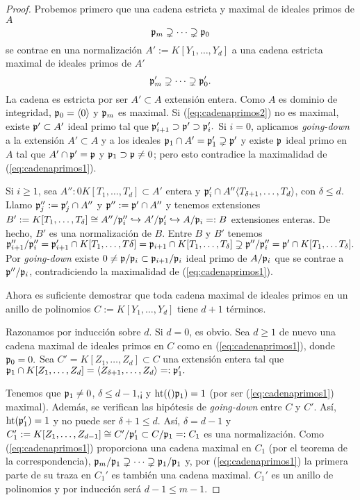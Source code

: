 \documentclass[../main.tex]{subfiles}
\begin{document}
\begin{proof}
	Probemos primero que una cadena estricta y maximal de ideales primos de $A$
	\begin{equation}\label{eq:cadenaprimos1}
	\mathfrak{p}_m\supsetneq\cdots\supsetneq\mathfrak{p}_0
	\end{equation}
	se contrae en una normalización $A':=K[Y_1,\dots,Y_d]$ a una cadena estricta maximal de ideales primos de $A'$
	\begin{equation}\label{eq:cadenaprimos2}
	\mathfrak{p}_m'\supsetneq\cdots\supsetneq\mathfrak{p}_0'.
	\end{equation}
	La cadena es estricta por ser $A'\subset A$ extensión entera. Como $A$ es dominio de integridad, $\mathfrak{p}_0=\langle 0\rangle$ y $\mathfrak{p}_m$ es maximal. Si (\ref{eq:cadenaprimos2}) no es maximal, existe $\mathfrak{p}'\subset A'$ ideal primo tal que $\mathfrak{p}_{i+1}'\supset\mathfrak{p}'\supset\mathfrak{p}_i'.$ Si $i=0$, aplicamos \textit{going-down} a la extensión $A'\subset A$ y a los ideales $\mathfrak{p}_1\cap A'=\mathfrak{p}_1'\supsetneq \mathfrak{p}'$ y existe $\mathfrak{p}$ ideal primo en $A$ tal que $A'\cap\mathfrak{p}'=\mathfrak{p}$ y $\mathfrak{p}_1\supset\mathfrak{p}\neq 0$; pero esto contradice la maximalidad de (\ref{eq:cadenaprimos1}).
	
	Si $i\ge 1$, sea $A'':0K[T_1,\dots, T_d]\subset A'$ entera y $\mathfrak{p}_i'\cap A''\langle T_{\delta+1},\dots, T_d\rangle$, con $\delta\le d.$ Llamo $\mathfrak{p}_j'':=\mathfrak{p}_j'\cap A''$ y $\mathfrak{p}'':=\mathfrak{p}'\cap A''$ y tenemos extensiones $B':=K[T_1,\dots,T_\delta]\cong A''/\mathfrak{p}_i''\hookrightarrow A'/\mathfrak{p}_i'\hookrightarrow A/\mathfrak{p}_i=:B$ extensiones enteras. De hecho, $B'$ es una normalización de $B.$ Entre $B$ y $B'$ tenemos $\mathfrak{p}_{i+1}''/\mathfrak{p}_i''=\mathfrak{p}_{i+1}'\cap K[T_1,\dots,T\delta]=\mathfrak{p}_{i+1}\cap K[T_1,\dots, T_\delta]\supsetneq \mathfrak{p}''/\mathfrak{p}_i''=\mathfrak{p}'\cap K[T_1,\dots T_\delta].$ Por \textit{going-down} existe $0\neq \mathfrak{p}/\mathfrak{p}_i\subset\mathfrak{p}_{i+1}/\mathfrak{p}_i$ ideal primo de $A/\mathfrak{p}_i$ que se contrae a $\mathfrak{p}''/\mathfrak{p}_i$, contradiciendo la maximalidad de (\ref{eq:cadenaprimos1}).
	
	Ahora es suficiente demostrar que toda cadena maximal de ideales primos en un anillo de polinomios $C:=K[Y_1,\dots,Y_d]$ tiene $d+1$ términos.
	
	Razonamos por inducción sobre $d.$ Si $d=0$, es obvio. Sea $d\ge 1$ de nuevo una cadena maximal de ideales primos en $C$ como en (\ref{eq:cadenaprimos1}), donde $\mathfrak{p}_0=0.$ Sea $C'=K[Z_1,\dots,Z_d]\subset C$ una extensión entera tal que $\mathfrak{p}_1\cap K[Z_1,\dots, Z_d]=\langle Z_{\delta+1},\dots, Z_d\rangle=:\mathfrak{p}_1'.$
	
	Tenemos que $\mathfrak{p}_1\neq 0$, $\delta\le d-1$,¡ y $\operatorname{ht}(()\mathfrak{p}_1)=1$ (por ser (\ref{eq:cadenaprimos1}) maximal). Además, se verifican las hipótesis de \textit{going-down} entre $C$ y $C'.$ Así, $\operatorname{ht}(\mathfrak{p}_1')=1$ y no puede ser $\delta+1\le d.$ Así, $\delta=d-1$ y $C_1':=K[Z_1,\dots, Z_{d-1}]\cong C'/\mathfrak{p}_1'\subset C/\mathfrak{p}_1=:C_1$ es una normalización. Como (\ref{eq:cadenaprimos1}) proporciona una cadena maximal en $C_1$ (por el teorema de la correspondencia), $\mathfrak{p}_m/\mathfrak{p}_1\supsetneq\cdots\supsetneq\mathfrak{p}_1/\mathfrak{p}_1$ y, por (\ref{eq:cadenaprimos1}) la primera parte de su traza en $C_1'$ es también una cadena maximal. $C_1'$ es un anillo de polinomios y por inducción será $d-1\le m-1.$
\end{proof}
\end{document}
